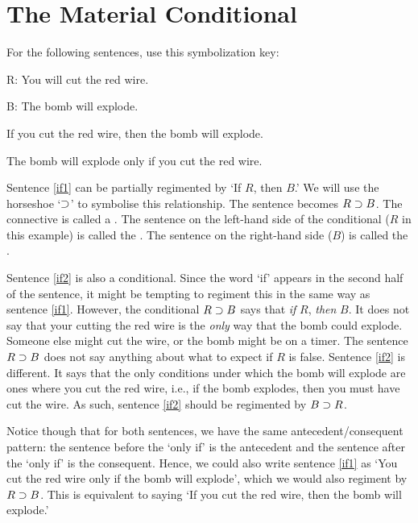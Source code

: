 \section{The Material Conditional}
For the following sentences, use this symbolization key:

\begin{ekey}
\item[R:] You will cut the red wire.
\item[B:] The bomb will explode.
\end{ekey}

\begin{earg}
\item[\ex{if1}] If you cut the red wire, then the bomb will explode.
\item[\ex{if2}] The bomb will explode only if you cut the red wire.
\end{earg}

Sentence \ref{if1} can be partially regimented by `If $R$, then $B$.'
We will use the horseshoe `$\supset$' to symbolise this relationship.
The sentence becomes $R\supset B$.
The connective is called a .
The sentence on the left-hand side of the conditional ($R$ in this example) is called the .
The sentence on the right-hand side ($B$) is called the .

Sentence \ref{if2} is also a conditional.
Since the word `if' appears in the second half of the sentence, it might be tempting to regiment this in the same way as sentence \ref{if1}.
However, the conditional $R\supset B$ says that \emph{if} $R$, \emph{then} $B$.
It does not say that your cutting the red wire is the \emph{only} way that the bomb could explode.
Someone else might cut the wire, or the bomb might be on a timer.
The sentence $R\supset B$ does not say anything about what to expect if $R$ is false. 
Sentence \ref{if2} is different.
It says that the only conditions under which the bomb will explode are ones where you cut the red wire, i.e., if the bomb explodes, then you must have cut the wire.
As such, sentence \ref{if2} should be regimented by $B \supset R$. 

Notice though that for both sentences, we have the same antecedent/consequent pattern: the sentence before the `only if' is the antecedent and the sentence after the `only if' is the consequent.
Hence, we could also write sentence \ref{if1} as `You cut the red wire only if the bomb will explode', which we would also regiment by $R\supset B$.
This is equivalent to saying `If you cut the red wire, then the bomb will explode.' 

